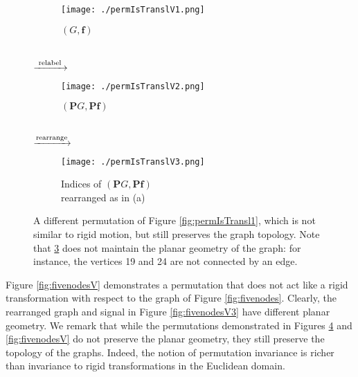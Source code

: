 \documentclass{article}
\def\BP{\boldsymbol{P}}
\def\Bf{\boldsymbol{f}}
\begin{document}
\begin{figure}[!ht]
\centering
\begin{subfigure}{.25\textwidth}
	\centering
    \texttt{[image: ./permIsTranslV1.png]}
    \caption{$(G, \Bf)$ \\ ~ }
\label{fig:permIsTranslV1}
\end{subfigure}
{\large$\xrightarrow{\textup{~relabel~}}$}\begin{subfigure}{.25\textwidth}
	\centering
    \texttt{[image: ./permIsTranslV2.png]}
    \caption{$(\BP G, \BP \Bf)$ \\ ~ }
\label{fig:permIsTranslV2}
\end{subfigure}
{\large$\xrightarrow{\textup{rearrange}}$}\begin{subfigure}{.25\textwidth}
	\centering
    \texttt{[image: ./permIsTranslV3.png]}
    \caption{Indices of $(\BP G, \BP \Bf)$ \\ rearranged as in (a)}
\label{fig:permIsTranslV3}
\end{subfigure}
\caption{{A different permutation of Figure \ref{fig:permIsTransl1}, which is not similar to rigid motion, but still preserves the graph topology. Note that \ref{fig:permIsTranslV3} does not maintain the planar geometry of the graph: for instance, the vertices 19 and 24 are not connected by an edge. }}
\label{fig:permIsTranslV}
\end{figure}

{Figure \ref{fig:fivenodesV} demonstrates a permutation that does not act like a rigid transformation with respect to the graph of Figure \ref{fig:fivenodes}. Clearly, the rearranged graph and signal in Figure \ref{fig:fivenodesV3} have different planar geometry. We remark that while the permutations demonstrated in Figures \ref{fig:permIsTranslV} and \ref{fig:fivenodesV} do not preserve the planar geometry, they still preserve the topology of the graphs. Indeed, the notion of permutation invariance is richer than invariance to rigid transformations in the Euclidean domain.}
\end{document}
